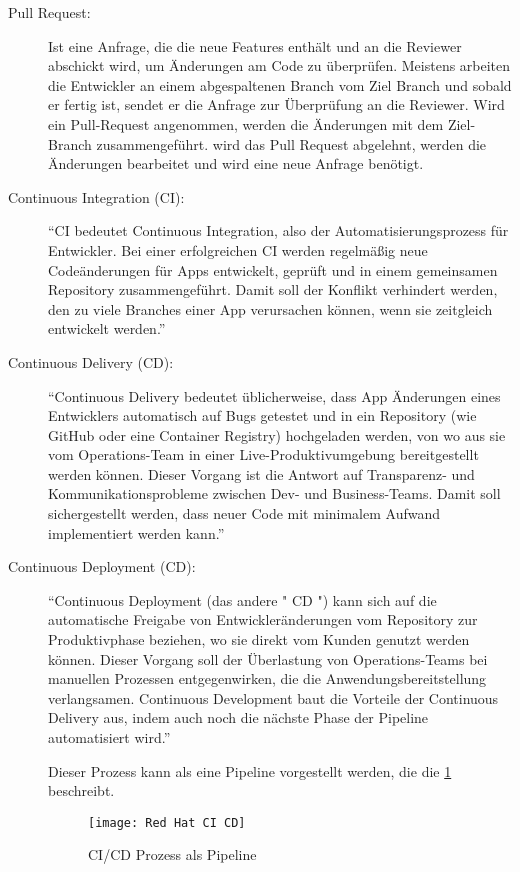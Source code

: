 \begin{description}
\begin{itemize}
\begin{description}
		\end{description}	
	\end{itemize}
				
	\item [Pull Request:]
		Ist eine Anfrage, die die neue Features enthält und an die Reviewer abschickt wird, um Änderungen am Code zu überprüfen. Meistens arbeiten die Entwickler an einem abgespaltenen 			Branch vom Ziel Branch und sobald er fertig ist, sendet er die Anfrage zur Überprüfung an die Reviewer. Wird ein Pull-Request angenommen, werden die Änderungen mit dem Ziel- 				Branch zusammengeführt. wird das Pull Request abgelehnt, werden die Änderungen bearbeitet und wird eine neue Anfrage benötigt.
	
	\item [Continuous Integration (CI):]
		"`CI bedeutet Continuous Integration, also der Automatisierungsprozess für Entwickler. Bei einer erfolgreichen CI werden regelmäßig neue Codeänderungen für Apps entwickelt, 				geprüft und in einem gemeinsamen Repository zusammengeführt. Damit soll der Konflikt verhindert werden, den zu viele Branches einer App verursachen können, wenn sie zeitgleich 			entwickelt werden."' \cite{RedHat}
			
	\item [Continuous Delivery (CD):]
		"`Continuous Delivery bedeutet üblicherweise, dass App Änderungen eines Entwicklers automatisch auf Bugs getestet und in ein Repository (wie GitHub oder eine Container 					Registry) hochgeladen werden, von wo aus sie vom Operations-Team in einer Live-Produktivumgebung bereitgestellt werden können. Dieser Vorgang ist die Antwort auf Transparenz- 				und Kommunikationsprobleme zwischen Dev- und Business-Teams. Damit soll sichergestellt werden, dass neuer Code mit minimalem Aufwand implementiert werden kann."' \cite{RedHat}
		
	\item [Continuous Deployment (CD):]
		"`Continuous Deployment (das andere " CD ") kann sich auf die automatische Freigabe von Entwickleränderungen vom Repository zur Produktivphase beziehen, wo sie direkt vom Kunden 			genutzt werden können. Dieser Vorgang soll der Überlastung von Operations-Teams bei manuellen Prozessen entgegenwirken, die die Anwendungsbereitstellung verlangsamen. Continuous 		Development baut die Vorteile der Continuous Delivery aus, indem auch noch die nächste Phase der Pipeline automatisiert wird."' \cite{RedHat}

	Dieser Prozess kann als eine Pipeline vorgestellt werden, die die \cref{fig:RedHat} beschreibt.
	\begin{figure}[H]
		\centering
		\texttt{[image: Red Hat CI CD]}
		\caption[Continuous Integration \& Continuous Delivery/Deployment]{\ac{CI}/\ac{CD} Prozess als Pipeline\\ \cite{RedHat}}
		\label{fig:RedHat}
	\end{figure}
	
\end{description}


